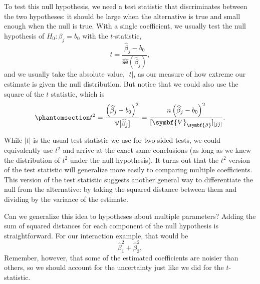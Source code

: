 \documentclass[
  13pt,
  letterpaper,
  DIV=11,
  numbers=noendperiod]{scrreprt}
\newcommand{\mb}{\symbf}
\newcommand{\V}{\mathbb{V}}
\newcommand{\se}{\textsf{se}}
\newcommand{\bfbeta}{\mb{\beta}}
\theoremstyle{definition}
\theoremstyle{definition}
\theoremstyle{plain}
\theoremstyle{remark}
\begin{document}
To test this null hypothesis, we need a test statistic that
discriminates between the two hypotheses: it should be large when the
alternative is true and small enough when the null is true. With a
single coefficient, we usually test the null hypothesis of
\(H_0: \beta_j = b_0\) with the \(t\)-statistic, \[ 
t = \frac{\widehat{\beta}_{j} - b_{0}}{\widehat{\se}(\widehat{\beta}_{j})},
\] and we usually take the absolute value, \(|t|\), as our measure of
how extreme our estimate is given the null distribution. But notice that
we could also use the square of the \(t\) statistic, which is
\begin{equation}\phantomsection\label{eq-squared-t}{ 
t^{2} = \frac{\left(\widehat{\beta}_{j} - b_{0}\right)^{2}}{\V[\widehat{\beta}_{j}]} = \frac{n\left(\widehat{\beta}_{j} - b_{0}\right)^{2}}{[\mb{V}_{\bfbeta}]_{[jj]}}. 
}\end{equation}

While \(|t|\) is the usual test statistic we use for two-sided tests, we
could equivalently use \(t^2\) and arrive at the exact same conclusions
(as long as we knew the distribution of \(t^2\) under the null
hypothesis). It turns out that the \(t^2\) version of the test statistic
will generalize more easily to comparing multiple coefficients. This
version of the test statistic suggests another general way to
differentiate the null from the alternative: by taking the squared
distance between them and dividing by the variance of the estimate.

Can we generalize this idea to hypotheses about multiple parameters?
Adding the sum of squared distances for each component of the null
hypothesis is straightforward. For our interaction example, that would
be \[ 
\widehat{\beta}_1^2 + \widehat{\beta}_3^2, 
\] Remember, however, that some of the estimated coefficients are
noisier than others, so we should account for the uncertainty just like
we did for the \(t\)-statistic.
\end{document}
